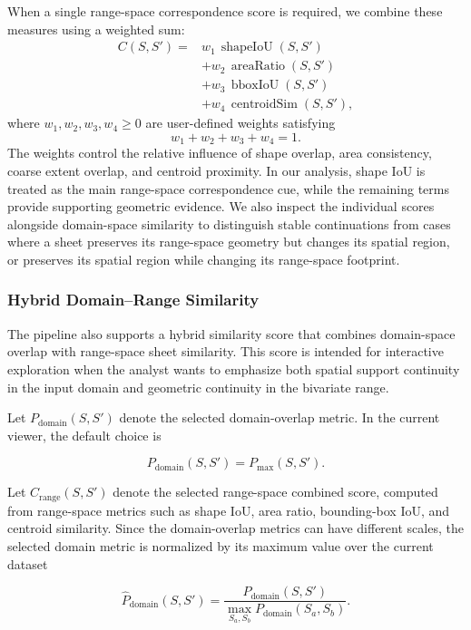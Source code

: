 \documentclass{vgtc}                          %
\newcommand{\Sheet}{S}
\newcommand{\Score}{C}
\begin{document}
When a single range-space correspondence score is required, we combine these measures using a weighted sum:
\[
\begin{aligned}
\Score(\Sheet,\Sheet') ={}&
w_1\,\operatorname{shapeIoU}(\Sheet,\Sheet') \\
&+w_2\,\operatorname{areaRatio}(\Sheet,\Sheet') \\
&+w_3\,\operatorname{bboxIoU}(\Sheet,\Sheet') \\
&+w_4\,\operatorname{centroidSim}(\Sheet,\Sheet'),
\end{aligned}
\]
where $w_1,w_2,w_3,w_4\geq 0$ are user-defined weights satisfying
\[
w_1+w_2+w_3+w_4=1.
\]
The weights control the relative influence of shape overlap, area consistency, coarse extent overlap, and centroid proximity. In our analysis, shape IoU is treated as the main range-space correspondence cue, while the remaining terms provide supporting geometric evidence. We also inspect the individual scores alongside domain-space similarity to distinguish stable continuations from cases where a sheet preserves its range-space geometry but changes its spatial region, or preserves its spatial region while changing its range-space footprint.

\subsubsection{Hybrid Domain--Range Similarity}

  The pipeline also supports a hybrid similarity score that combines domain-space
  overlap with range-space sheet similarity. This score is intended for
  interactive exploration when the analyst wants to emphasize both spatial support
  continuity in the input domain and geometric continuity in the bivariate range.

  Let $P_\mathrm{domain}(\Sheet,\Sheet')$ denote the selected domain-overlap
  metric. In the current viewer, the default choice is

  \[
  P_\mathrm{domain}(\Sheet,\Sheet') =
  P_\mathrm{max}(\Sheet,\Sheet').
  \]

  Let $C_\mathrm{range}(\Sheet,\Sheet')$ denote the selected range-space
  combined score, computed from range-space metrics such as shape IoU, area
  ratio, bounding-box IoU, and centroid similarity. Since the domain-overlap
  metrics can have different scales, the selected domain metric is normalized by
  its maximum value over the current dataset

  \[
  \widehat{P}_\mathrm{domain}(\Sheet,\Sheet') =
  \frac{P_\mathrm{domain}(\Sheet,\Sheet')}
  {\max_{\Sheet_a,\Sheet_b} P_\mathrm{domain}(\Sheet_a,\Sheet_b)}.
  \]
\end{document}
